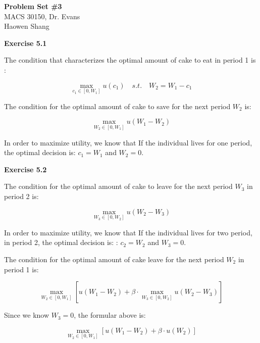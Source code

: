 \documentclass[letterpaper,12pt]{article}
\theoremstyle{definition}
\begin{document}
\begin{flushleft}
  \textbf{\large{Problem Set \#3}} \\
  MACS 30150, Dr. Evans \\
  Haowen Shang
\end{flushleft}

\vspace{5mm}

\noindent\textbf{Exercise 5.1}

The condition that characterizes the optimal amount of cake to eat in period 1 is :

\begin{equation*}
  \max_{c_{1}\in \left [ 0,W_{1} \right ]}u\left ( c_{1} \right )\quad s.t. \quad W_{2} = W_{1} - c_{1}
\end{equation*}

The condition for the optimal amount of cake to save for the next period $W_{2}$ is:

\begin{equation*}
  \max_{W_{2}\in \left [ 0,W_{1} \right ]}u\left ( W_{1}-W_{2} \right )
\end{equation*}

In order to maximize utility, we know that If the individual lives for one period, the optimal decision is:  $c_{1} = W_{1}$ and $W_{2} = 0$.


\noindent\textbf{Exercise 5.2}

The condition for the optimal amount of cake to leave for the next period $W_{3}$ in period 2 is:

\begin{equation*}
  \max_{W_{3}\in \left [ 0,W_{2} \right ]}u\left ( W_{2}-W_{3} \right )
\end{equation*}

In order to maximize utility, we know that If the individual lives for two period, in period 2, the optimal decision is:  : $c_{2} = W_{2}$ and $W_{3} = 0$.

The condition for the optimal amount of cake leave for the next period $W_{2}$ in period 1 is:

\begin{equation*}
  \max_{W_{2}\in \left [ 0,W_{1} \right ]} \left [  u\left ( W_{1}-W_{2} \right )+\beta\cdot \max_{W_{3}\in \left [ 0,W_{2} \right ]} u\left ( W_{2}-W_{3}\right )\right ]
\end{equation*}


Since we know $W_{3} = 0$, the formular above is:

\begin{equation*}
  \max_{W_{2}\in \left [ 0,W_{1} \right ]} \left [  u\left ( W_{1}-W_{2} \right )+\beta\cdot  u\left ( W_{2} \right )\right ]
\end{equation*}
\end{document}
